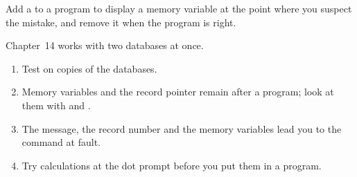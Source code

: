 \begin{Tip}
Add a  to a program to display a memory variable at the point where you
suspect the mistake, and remove it when the program is right.
\end{Tip}

Chapter~14 works with two databases at once.

\begin{enumerate}
\item Test on copies of the databases.
\item Memory variables and the record pointer remain after a program; look at
  them with  and .
\item The message, the record number and the memory variables lead you to the
  command at fault.
\item Try calculations at the dot prompt before you put them in a program.
\end{enumerate}

